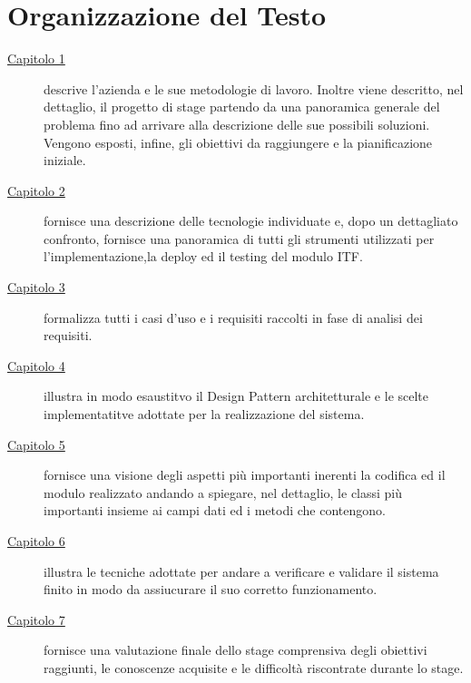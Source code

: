 
\cleardoublepage
{}
{}
\begingroup
\let\clearpage\relax
\let\cleardoublepage\relax
\let\cleardoublepage\relax

\chapter*{Organizzazione del Testo}

\begin{description}
	\item[{\hyperref[cap:introduzione]{Capitolo 1}}] descrive l'azienda e le sue metodologie di lavoro. Inoltre viene descritto, nel dettaglio, il progetto di stage partendo da una panoramica generale del problema fino ad arrivare alla descrizione delle sue possibili soluzioni. Vengono esposti, infine, gli obiettivi da raggiungere e la pianificazione iniziale.
	
	\item[{\hyperref[cap:tecnologie_e_strumenti]{Capitolo 2}}] fornisce una descrizione delle tecnologie individuate e, dopo un dettagliato confronto, fornisce una panoramica di tutti gli strumenti utilizzati per l'implementazione,la deploy ed il testing del modulo ITF. 
	
	\item[{\hyperref[cap:analisi_dei_requisiti]{Capitolo 3}}] formalizza tutti i casi d'uso e i requisiti raccolti in fase di analisi dei requisiti.
	
	\item[{\hyperref[cap:progettazione]{Capitolo 4}}] illustra in modo esaustitvo il Design Pattern architetturale e le scelte implementatitve adottate per la realizzazione del sistema.
	
	\item[{\hyperref[cap:codifica]{Capitolo 5}}] fornisce una visione degli aspetti più importanti inerenti la codifica ed il modulo realizzato andando a spiegare, nel dettaglio, le classi più importanti insieme ai campi dati ed i metodi che contengono.
	
	\item[{\hyperref[cap:verifica_validazione]{Capitolo 6}}] illustra le tecniche adottate per andare a verificare e validare il sistema finito in modo da assiucurare il suo corretto funzionamento.
	
	\item[{\hyperref[cap:valutazione_finale]{Capitolo 7}}] fornisce una valutazione finale dello stage comprensiva degli obiettivi raggiunti, le conoscenze acquisite e le difficoltà riscontrate durante lo stage.
	
\end{description}

